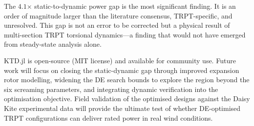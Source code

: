 \documentclass[11pt,a4paper]{article}
\begin{document}
The $4.1$$\times$ static-to-dynamic power gap is the most significant finding. It is an order of magnitude larger than the literature consensus, TRPT-specific, and unresolved. This gap is not an error to be corrected but a physical result of multi-section TRPT torsional dynamics—a finding that would not have emerged from steady-state analysis alone.

KTD.jl is open-source (MIT license) and available for community use. Future work will focus on closing the static-dynamic gap through improved expansion rotor modelling, widening the DE search bounds to explore the region beyond the six screaming parameters, and integrating dynamic verification into the optimisation objective. Field validation of the optimised designs against the Daisy Kite experimental data \cite{read_various} will provide the ultimate test of whether DE-optimised TRPT configurations can deliver rated power in real wind conditions.

\end{document}
